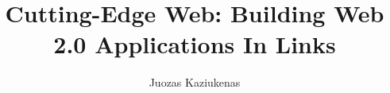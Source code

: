 \documentclass[bsc,frontabs]{infthesis}
\title{Cutting-Edge Web: Building Web 2.0 Applications In Links}
\author{Juozas Kaziukenas}
\begin{document}
\begin{preliminary}

\maketitle

\standarddeclaration


\tableofcontents


\end{preliminary}









% 

\appendix






\end{document}

